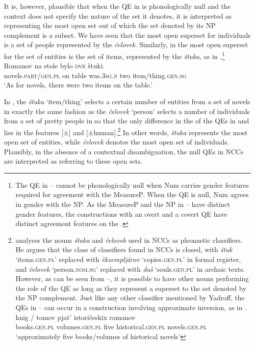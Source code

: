 \documentclass[output=paper,modfonts,newtxmath,hidelinks]{langscibook}
\begin{document}
\noindent It is, however, plausible that when the QE in  is phonologically null and the context does not specify the nature of the set it denotes, it is interpreted as representing the most open set out of which the set denoted by its NP\textsubscript{} complement is a subset. We have seen that the most open superset for individuals is a set of people represented by the  \textit{čelovek}. Similarly, in  the most open superset for the set of  entities is the set of items, represented by the  \textit{štuka}, as in .\footnote{\label{18:fn22}The QE in -- cannot be phonologically null when Num carries  gender features required for agreement with the  MeasureP. When the QE is null, Num agrees in gender with the  NP. As the MeasureP and the NP in -- have distinct gender features, the constructions with an overt and a covert QE have distinct agreement features on the .
} 
\ea \label{18:ex33}
\gll Romanov  na   stole  bylo  \textsc{dve}  štuki.\\
     novels.\textsc{part/gen.pl} on table  was.\textsc{3sg.n}  two  item/thing.\textsc{gen.sg}\\
\glt  `As for novels, there were two items on the table.'
\z

\largerpage
\noindent In , the  \textit{štuka} ‘item/thing’ selects a certain number of entities from a set of novels in exactly the same fashion as the  \textit{čelovek} ‘person’ selects a number of individuals from a set of pretty people in  so that the only difference in the  of the QEs in  and  lies in the features [$\pm$] and [$\pm$human].\footnote{\label{18:fn23}\citet{Yadroff1999} analyses the nouns \textit{štuka} and \textit{čelovek} used in NCCs as pleonastic  classifiers. He argues that the class of classifiers found in NCCs is closed, with \textit{štuk} ‘items\textsc{.gen.pl’} replaced with \textit{èkzempljárov} ‘copies\textsc{.gen.pl’} in formal register, and \textit{čelovek} ‘person.\textsc{nom.sg’} replaced with \textit{duš} ‘souls\textsc{.gen.pl’} in archaic texts. However, as can be seen from --, it is possible to have other nouns performing the role of the QE as long as they represent a superset to the set denoted by the NP complement. Just like any other classifier mentioned by Yadroff, the QEs in -- can occur in a construction involving approximate inversion, as in .  
\ea \label{18:fn23i}
\gll knig / tomov    pjat’   istoričeskix   romanov  \\
 	 books.\textsc{gen.pl} {} volumes.\textsc{gen.pl} five  historical.\textsc{gen.pl}   novels.\textsc{gen.pl}  \\
\glt `approximately five books/volumes of historical novels'
\zlast} 
In other words, \textit{štuka} represents the most open set of entities, while \textit{čelovek} denotes the most open set of individuals. Plausibly, in the absence of a contextual disambiguation, the null QEs in NCCs are interpreted as referring to these open sets.
\end{document}
